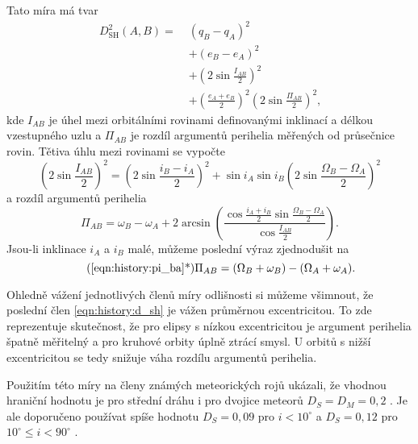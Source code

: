 Tato míra má tvar \cite{dsh}\cite{remarks}
\begin{equation}
    \begin{aligned}
        D_\text{SH}^2(A,B)=\; & (q_B-q_A)^2                                                                         \\
                         & +(e_B-e_A)^2                                                                        \\
                         & +\left( 2\sin{\frac{I_{AB}}{2}} \right)^2                                           \\
                         & +\left( \frac{e_A+e_B}{2} \right)^2\left( 2\sin{\frac{\Pi_{AB}}{2}} \right)^2 \text{,}
    \end{aligned}
    \label{eqn:history:d_sh}
\end{equation}
kde $I_{AB}$ je úhel mezi orbitálními rovinami definovanými inklinací a délkou vzestupného uzlu a $\Pi_{AB}$ je rozdíl argumentů perihelia měřených od průsečnice rovin. Tětiva úhlu mezi rovinami se vypočte \cite{dsh}
\begin{equation}
    \left( 2\sin{\frac{I_{AB}}{2}} \right)^2=\left( 2\sin{\frac{i_B-i_A}{2}} \right)^2
    + \sin{i_A}\sin{i_B}\left( 2\sin{\frac{\Omega_B-\Omega_A}{2}} \right)^2
\end{equation}
a rozdíl argumentů perihelia \cite{dsh}
\begin{equation}
    \Pi_{AB}=\omega_B-\omega_A+2\arcsin{\left( \frac{\cos{\frac{i_A+i_B}{2}}\sin{\frac{\Omega_B-\Omega_A}{2}}}{\cos{\frac{I_{AB}}{2}}} \right)} \text{.}
    \label{eqn:history:pi_ba}
\end{equation}
Jsou-li inklinace $i_A$ a $i_B$ malé, můžeme poslední výraz zjednodušit na \cite{dsh}
\begin{equation}
    \tag{\ref{eqn:history:pi_ba}*}
    \Pi_{AB}=(\Omega_B+\omega_B)-(\Omega_A+\omega_A) \text{.}
\end{equation}

Ohledně vážení jednotlivých členů míry odlišnosti si můžeme všimnout, že poslední člen \eqref{eqn:history:d_sh} je vážen průměrnou excentricitou. To zde reprezentuje skutečnost, že pro elipsy s nízkou excentricitou je argument perihelia špatně měřitelný \cite{cometassoc} a pro kruhové orbity úplně ztrácí smysl. U orbitů s nižší excentricitou se tedy snižuje váha rozdílu argumentů perihelia.

\smallskip

Použitím této míry na členy známých meteorických rojů \citeauthor{dsh} ukázali, že vhodnou hraniční hodnotu je pro střední dráhu i pro dvojice meteorů $D_S=D_M=0{,}2$ \cite{dsh}. Je ale doporučeno používat spíše hodnotu $D_S=0{,}09$ pro $i<10^\circ$ a $D_S=0{,}12$ pro $10^\circ\le i<90^\circ$ \cite{galligan}.